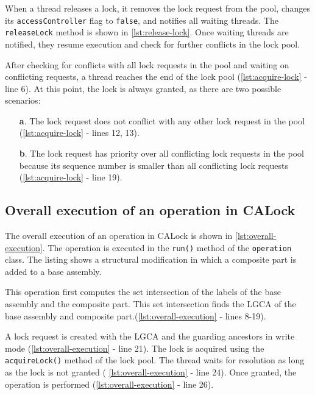 When a thread releases a lock, it removes the lock request from the pool, changes its \texttt{accessController} flag to \texttt{false}, and notifies all waiting threads. The \texttt{releaseLock} method is shown in  \cref{lst:release-lock}. Once waiting threads are notified, they resume execution and check for further conflicts in the lock pool.


After checking for conflicts with all lock requests in the pool and waiting on conflicting requests, a thread reaches the end of the lock pool (\cref{lst:acquire-lock} - line 6). At this point, the lock is always granted, as there are two possible scenarios:

\begin{enumerate}
    \item[\textbf{a}.] The lock request does not conflict with any other lock request in the pool (\cref{lst:acquire-lock} - lines 12, 13).
    \item[\textbf{b}.] The lock request has priority over all conflicting lock requests in the pool because its sequence number is smaller than all conflicting lock requests (\cref{lst:acquire-lock} - line 19). 
\end{enumerate}



\subsection{Overall execution of an operation in CALock}

The overall execution of an operation in CALock is shown in  \cref{lst:overall-execution}. The operation is executed in the \texttt{run()} method of the \texttt{operation} class. The listing shows a structural modification in which a composite part is added to a base assembly.

This operation first computes the set intersection of the labels of the base assembly and the composite part. This set intersection finds the LGCA of the base assembly and composite part.(\cref{lst:overall-execution} - lines 8-19).

A lock request is created with the LGCA and the guarding ancestors in write mode (\cref{lst:overall-execution} - line 21). The lock is acquired using the \texttt{acquireLock()} method of the lock pool. The thread waits for resolution as long as the lock is not granted ( \cref{lst:overall-execution} - line 24). Once granted, the operation is performed (\cref{lst:overall-execution} - line 26).


